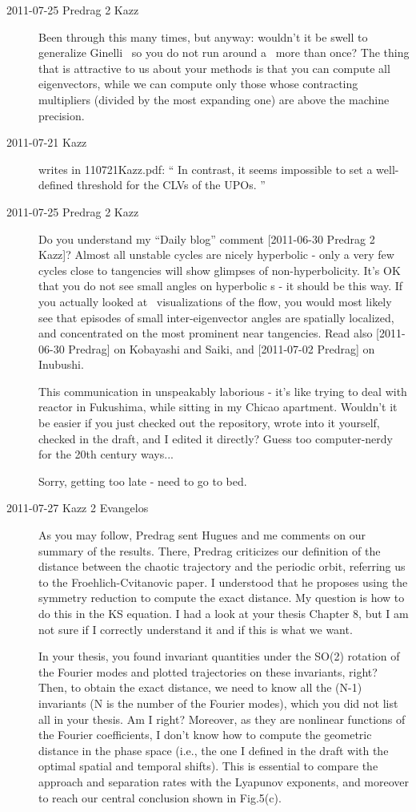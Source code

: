 \begin{description}
\item[2011-07-25 Predrag 2 Kazz]
Been through this many times, but anyway: wouldn't it be swell to
generalize Ginelli \etal\ so you do not run around a \po\ more than once?
The thing that is attractive to us about your methods is that you can
compute all eigenvectors, while we can compute only those whose
contracting multipliers (divided by the most expanding one) are above the
machine precision.

\item[2011-07-21 Kazz] writes in 110721Kazz.pdf:
``
In contrast, it seems impossible to set a well-defined threshold for the
CLVs of the UPOs.
''

\item[2011-07-25 Predrag 2 Kazz]
Do you understand my ``Daily blog'' comment  [2011-06-30 Predrag 2 Kazz]?
Almost all unstable cycles are nicely hyperbolic - only a very few cycles
close to tangencies will show glimpses of non-hyperbolicity. It's OK that
you do not see small angles on hyperbolic \po s - it should be this way.
If you actually looked at \statesp\ visualizations of the
flow, you would most likely see that
episodes of small inter-eigenvector angles are spatially localized, and
concentrated on the most prominent near tangencies. Read also [2011-06-30
Predrag] on Kobayashi and Saiki, and [2011-07-02 Predrag] on Inubushi.

This communication in unspeakably laborious - it's like trying to deal
with reactor in Fukushima, while sitting in my Chicao apartment. Wouldn't
it be easier if you just checked out the repository, wrote into it
yourself, checked in the draft, and I edited it directly? Guess too
computer-nerdy for the 20th century ways...

Sorry, getting too late - need to go to bed.

\item[2011-07-27 Kazz 2 Evangelos] As you may follow, Predrag sent Hugues and me comments on our summary of the results. There, Predrag criticizes our definition of the distance between the chaotic trajectory and the periodic orbit, referring us to the Froehlich-Cvitanovic paper. I understood that he proposes using the symmetry reduction to compute the exact distance. My question is how to do this in the KS equation. I had a look at your thesis Chapter 8, but I am not sure if I correctly understand it and if this is what we want.

In your thesis, you found invariant quantities under the SO(2) rotation of the Fourier modes and plotted trajectories on these invariants, right? Then, to obtain the exact distance, we need to know all the (N-1) invariants (N is the number of the Fourier modes), which you did not list all in your thesis. Am I right? Moreover, as they are nonlinear functions of the Fourier coefficients, I don't know how to compute the geometric distance in the phase space (i.e., the one I defined in the draft with the optimal spatial and temporal shifts). This is essential to compare the approach and separation rates with the Lyapunov exponents, and moreover to reach our central conclusion shown in Fig.5(c).


\end{description}
